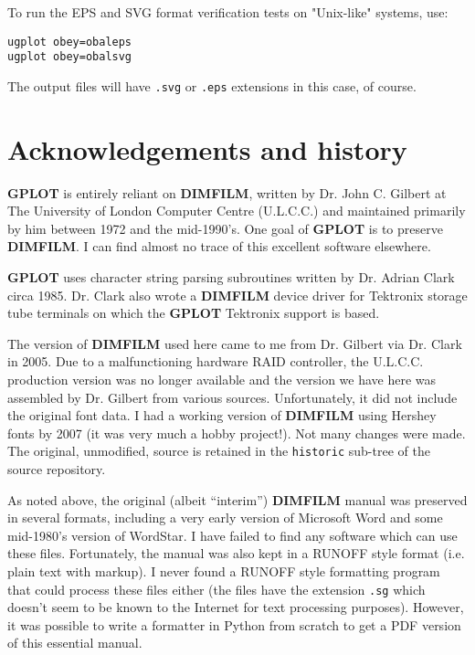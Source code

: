 \documentclass[a4paper,twoside,11pt]{article}
\newcommand{\newpara}{\par\vspace{4mm}\noindent}
\begin{document}
\newpara
To run the EPS and SVG format verification tests on
"Unix-like" systems, use:
\begin{lstlisting}
ugplot obey=obaleps
ugplot obey=obalsvg
\end{lstlisting}

\newpara
The output files will have \texttt{.svg} or \texttt{.eps} extensions in 
this case, of course.



\section{Acknowledgements and history}
\newpara
\textbf{GPLOT} is entirely reliant on \textbf{DIMFILM}, written by Dr. John C. Gilbert at The University of London
Computer Centre (U.L.C.C.) and maintained primarily by him between 1972 and the mid-1990's. One goal of \textbf{GPLOT} is to
preserve \textbf{DIMFILM}. I can find almost no trace of this excellent software elsewhere.

\newpara
\textbf{GPLOT} uses character
string parsing subroutines written by Dr. Adrian Clark circa 1985. Dr. Clark also wrote a \textbf{DIMFILM} device
driver for Tektronix storage tube terminals on which the \textbf{GPLOT} Tektronix support
is based.

\newpara
The version of \textbf{DIMFILM} used here came to me from Dr. Gilbert via Dr. Clark in 2005. Due to a malfunctioning hardware
RAID controller, the U.L.C.C. production version was no longer available and the version we have here
was assembled by Dr. Gilbert from various sources. Unfortunately, it did not include the original font data. I had a
working version of \textbf{DIMFILM} using Hershey fonts by 2007 (it was very much a hobby project!). Not many changes were made.
The original, unmodified, source is retained in the \texttt{historic} sub-tree of the source repository.

\newpara
As noted above,
the original (albeit ``interim'') \textbf{DIMFILM} manual was preserved in several formats, including a very early version
of Microsoft Word and some mid-1980's version of WordStar. I have failed to find any software which can use these
files. Fortunately, the manual was also kept in a RUNOFF style format (i.e. plain text with markup). I never found
a RUNOFF style formatting program that could process these files either (the files have the extension \texttt{.sg} which
doesn't seem to be known to the Internet for text processing purposes). However, it was possible to write a
formatter in Python from scratch to get a PDF version of this essential manual.
\end{document}
